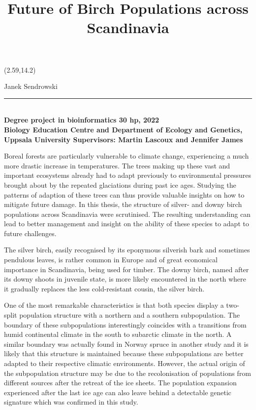 \documentclass[10pt]{article}
\begin{document}
\setlength{\droptitle}{-9em}
\title{Future of Birch Populations across Scandinavia}
\date{}
\begin{textblock}{80}(2.59,14.2)
        \begin{flushleft}
            \large Janek Sendrowski \\
            \vspace{-0.7em}
            \rule{35.37em}{1pt} \\
            \vspace{-0.02cm}
            \fontsize{9pt}{10.5pt}\color{gray}\textbf{Degree project in bioinformatics 30 hp, 2022 \\
            Biology Education Centre and Department of Ecology and Genetics, \\
            Uppsala University Supervisors: Martin Lascoux and Jennifer James \\}
        \end{flushleft}
    \end{textblock}
 
\maketitle
\vspace{-4em}
Boreal forests are particularly vulnerable to climate change, experiencing a much more drastic increase in temperatures. The trees making up these vast and important ecosystems already had to adapt previously to environmental pressures brought about by the repeated glaciations during past ice ages. Studying the patterns of adaption of these trees can thus provide valuable insights on how to mitigate future damage. In this thesis, the structure of silver-  and downy birch populations across Scandinavia were scrutinised. The resulting understanding can lead to better management and insight on the ability of these species to adapt to future challenges. 

The silver birch, easily recognised by its eponymous silverish bark and sometimes pendulous leaves, is rather common in Europe and of great economical importance in Scandinavia, being used for timber. The downy birch, named after its downy shoots in juvenile state, is more likely encountered in the north where it gradually replaces the less cold-resistant cousin, the silver birch.

One of the most remarkable characteristics is that both species display a two-split population structure with a northern and a southern subpopulation. The boundary of these subpopulations interestingly coincides with a transitions from humid continental climate in the south to subarctic climate in the north. A similar boundary was actually found in Norway spruce in another study and it is likely that this structure is maintained because these subpopulations are better adapted to their respective climatic environments. However, the actual origin of the subpopulation structure may be due to the recolonisation of populations from different sources after the retreat of the ice sheets. The population expansion experienced after the last ice age can also leave behind a detectable genetic signature which was confirmed in this study. 
\end{document}
